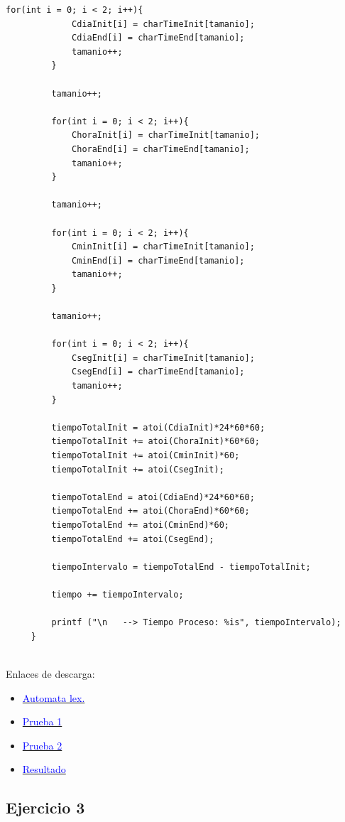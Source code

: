 \begin{lstlisting}[frame=single]
	     for(int i = 0; i < 2; i++){
		     CdiaInit[i] = charTimeInit[tamanio];
		     CdiaEnd[i] = charTimeEnd[tamanio];
		     tamanio++;
	     }
	     
	     tamanio++;
	     
	     for(int i = 0; i < 2; i++){
		     ChoraInit[i] = charTimeInit[tamanio];
		     ChoraEnd[i] = charTimeEnd[tamanio];
		     tamanio++;
	     }
	     
	     tamanio++;
	     
	     for(int i = 0; i < 2; i++){
		     CminInit[i] = charTimeInit[tamanio];
		     CminEnd[i] = charTimeEnd[tamanio];
		     tamanio++;
	     }
	     
	     tamanio++;
	     
	     for(int i = 0; i < 2; i++){
		     CsegInit[i] = charTimeInit[tamanio];
		     CsegEnd[i] = charTimeEnd[tamanio];
		     tamanio++;
	     }
	     
	     tiempoTotalInit = atoi(CdiaInit)*24*60*60;
	     tiempoTotalInit += atoi(ChoraInit)*60*60;
	     tiempoTotalInit += atoi(CminInit)*60;
	     tiempoTotalInit += atoi(CsegInit);
	     
	     tiempoTotalEnd = atoi(CdiaEnd)*24*60*60;
	     tiempoTotalEnd += atoi(ChoraEnd)*60*60;
	     tiempoTotalEnd += atoi(CminEnd)*60;
	     tiempoTotalEnd += atoi(CsegEnd);
	     
	     tiempoIntervalo = tiempoTotalEnd - tiempoTotalInit;
	     
	     tiempo += tiempoIntervalo;
	     
	     printf ("\n   --> Tiempo Proceso: %is", tiempoIntervalo);
     }
    
	 \end{lstlisting}
	 
	 Enlaces de descarga:
	 \begin{itemize}
	 	\item  \href{https://www.dropbox.com/s/hopkh3n6ucnwzmk/automataIN.l?dl=0}{ \textcolor{blue}{Automata lex.}}
	 	\item  \href{https://www.dropbox.com/s/jybcbsmnqem10nn/log-prueba20?dl=0}{ \textcolor{blue}{Prueba 1}}
	 	\item  \href{https://www.dropbox.com/s/1035oj3gs0gvl8d/log-prueba14?dl=0}{ \textcolor{blue} {Prueba 2} }
	 	\item  \href{https://www.dropbox.com/s/cl5v90zl3yn1u9i/p?dl=0}{ \textcolor{blue} {Resultado} }
	 \end{itemize}
	 
\subsection{Ejercicio 3}

